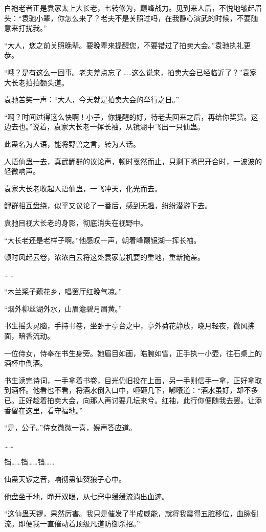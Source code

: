 \begin{this_body}
白袍老者正是袁家太上大长老，七转修为，巅峰战力。见到来人后，不悦地皱起眉头：“袁驰小辈，你怎么来了？老夫不是关照过吗，在我静心演武的时候，不要随意来打扰我。”

“大人，您之前关照晚辈。要晚辈来提醒您，不要错过了拍卖大会。”袁驰执礼更恭。

“哦？是有这么一回事。老夫差点忘了……这么说来，拍卖大会已经临近了？”袁家大长老拍拍额头道。

袁驰苦笑一声：“大人，今天就是拍卖大会的举行之日。”

“啊？时间过得这么快啊！小子，你提醒的好，待老夫回来之后，再给你奖赏。这边去也。”说着，袁家大长老一挥长袖，从镜湖中飞出一只仙蛊。

此蛊名为人语，能将野兽之言，转为人话。

人语仙蛊一去，真武鲤群的议论声，顿时戛然而止，只剩下嘴巴开合时，一波波的轻微响声。

袁家大长老收起人语仙蛊，一飞冲天，化光而去。

鲤群相互盘绕，似乎又议论了一番后，感到无趣，纷纷潜游下去。

袁驰目视大长老的身影，彻底消失在视野中。

“大长老还是老样子啊。”他感叹一声，朝着峰巅镜湖一挥长袖。

顿时风起云卷，浓浓白云将这处袁家最机要的重地，重新掩盖。

……

“木兰桨子藕花乡，唱罢厅红晚气凉。”

“烟外柳丝湖外水，山眉澹碧月眉黄。”

书生摇头晃脑，手持书卷，坐卧于亭台之中，亭外荷花静放，晓月轻夜，微风拂面，暗香流动。

一位侍女，侍奉在书生身旁。她眉目如画，皓腕如雪，正手执一小壶，往石桌上的酒杯中倒酒。

书生读完诗词，一手拿着书卷，目光仍旧投在上面，另一手则信手一拿，正好拿取到酒杯。他看也不看，将酒水倒入口中，咂砸几下，嘟囔道：“酒水虽好，却不多已。正好趁着拍卖大会，向那人再讨要几坛来兮。红袖，此行你便随我去罢。让添香留在这里，看守福地。”

“是，公子。”侍女微微一喜，婉声答应道。

……

铛……铛……铛……

仙蛊天锣之音，响彻蛊仙贺狼子心中。

他盘坐于地，睁开双眼，从七窍中缓缓流淌出血迹。

“这仙蛊天锣，果然厉害。我只是催发了半成威能，就将我震得五脏移位，血脉倒流。即便我一直催动着顶级凡道防御杀招。”


\end{this_body}
